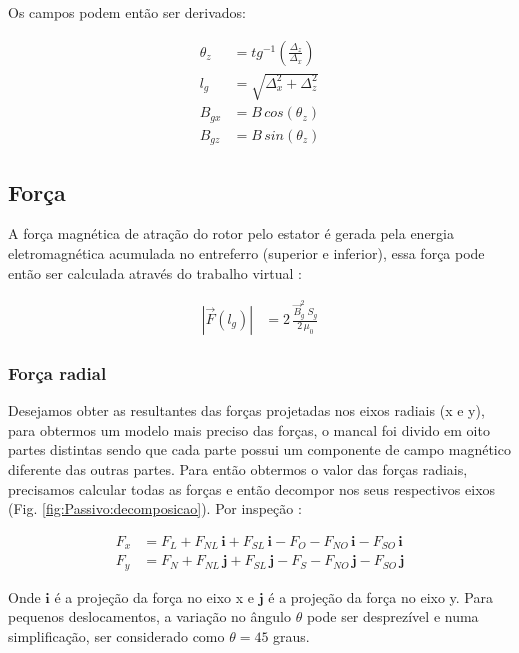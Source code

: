  Os campos podem então ser derivados:
 
 \begin{align}
 	\theta_z &= tg^{-1}(\frac{\Delta_z}{\Delta_x}) \\
 	l_g &= \sqrt{\Delta_x^2 + \Delta_z^2} \\
 	B_{gx} &= B \, cos(\theta_z) \\
 	B_{gz} &= B \, sin(\theta_z) 
 \end{align}


\subsection{Força}

A força magnética de atração do rotor pelo estator é gerada pela energia eletromagnética acumulada no entreferro (superior e inferior), essa força pode então ser calculada através do trabalho virtual \citep{Chiba}:

\begin{align}
	|\vec{F}(l_g)| &= 2 \, \frac{ \vec{B}_{g}^2 \; S_g}{2 \, \mu_0} \label{eq:passivo:Fx}
\end{align}

\subsubsection{Força radial} \label{subsection:forca:x}


Desejamos obter as resultantes das forças projetadas nos eixos radiais (x e y), para obtermos um modelo mais preciso das forças, o mancal foi divido em oito partes distintas sendo que cada parte possui um componente de campo magnético diferente das outras partes. Para então obtermos o valor das forças radiais, precisamos calcular todas as forças e então decompor nos seus respectivos eixos (Fig. \ref{fig:Passivo:decomposicao}). Por inspeção :

\begin{align}
	F_x &= F_{L} + F_{NL} \, \boldsymbol{i} + F_{SL} \, \boldsymbol{i} - F_{O} - F_{NO} \, \boldsymbol{i}  - F_{SO} \, \boldsymbol{i} \label{eq:p:F:resultante:x} \\
	F_y &= F_{N} + F_{NL} \, \boldsymbol{j} + F_{SL} \, \boldsymbol{j} - F_{S} - F_{NO} \, \boldsymbol{j}  - F_{SO} \, \boldsymbol{j}
	\label{eq:p:F:resultante:y} 
\end{align}

Onde $\boldsymbol{i}$ é a projeção da força no eixo x e $\boldsymbol{j}$ é a projeção da força no eixo y. Para pequenos deslocamentos, a variação no ângulo $\theta$ pode ser desprezível e numa simplificação, ser considerado como $\theta = 45$ graus.

